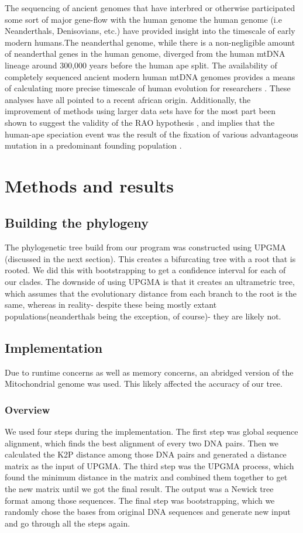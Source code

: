 \documentclass[a4paper]{article}
\begin{document}
The sequencing of ancient genomes that have interbred or otherwise participated some sort of major gene-flow with the human genome the human genome (i.e Neanderthals, Denisovians, etc.) \cite{neanderthal} have provided insight into the timescale of early modern humans.The neanderthal genome, while there is a non-negligible amount of neanderthal genes in the human genome, diverged from the human mtDNA lineage around 300,000 years before the human ape split. The availability of completely sequenced ancient modern human mtDNA genomes provides a means of calculating more precise timescale of human evolution for researchers \cite{ancient}. These analyses have all pointed to a recent african origin. Additionally, the improvement of methods using larger data sets have for the most part been shown to suggest the validity of the RAO hypothesis \cite{penny}, and implies that the human-ape speciation event was the result of the fixation of various advantageous mutation in a predominant founding population \cite{multiregionalis}.
\section{Methods and results}

\subsection{Building the phylogeny}
The phylogenetic tree build from our program was constructed using UPGMA (discussed in the next section). This creates a bifurcating tree with a root that is rooted. We did this with bootstrapping to get a confidence interval for each of our clades. The downside of using UPGMA is that it creates an ultrametric tree, which assumes that the evolutionary distance from each branch to the root is the same, whereas in reality- despite these being mostly extant populations(neanderthals being the exception, of course)- they are likely not.
\subsection{Implementation}
Due to runtime concerns as well as memory concerns, an abridged version of the Mitochondrial genome was used. This likely affected the accuracy of our tree.

\subsubsection{Overview}
We used four steps during the implementation. The first step was global sequence alignment, which finds the best alignment of every two DNA pairs. Then we calculated the K2P distance among those DNA pairs and generated a distance matrix as the input of UPGMA. The third step was the UPGMA process, which found the minimum distance in the matrix and combined them together to get the new matrix until we got the final result. The output was a Newick tree format among those sequences. The final step was bootstrapping, which we randomly chose the bases from original DNA sequences and generate new input and go through all the steps again.
\end{document}
